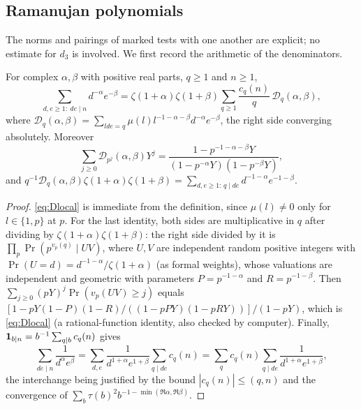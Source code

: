 \documentclass[11pt,colorlinks]{charlie}
\begin{document}
\subsection{Ramanujan polynomials}
The norms and pairings of marked tests with one another are explicit; no estimate for $d_3$ is involved. We first record the arithmetic of the denominators.

\begin{lemma}\label{lem:localfactor}
For complex $\alpha,\beta$ with positive real parts, $q\ge1$ and $n\ge1$,
\begin{equation}\label{eq:ramanujaninv}
 \sum_{d,e\ge1:\ de\mid n}d^{-\alpha}e^{-\beta}=\zeta(1+\alpha)\zeta(1+\beta)\sum_{q\ge1}\frac{c_q(n)}q\,\mathcal D_q(\alpha,\beta),
\end{equation}
where $\mathcal D_q(\alpha,\beta)=\sum_{lde=q}\mu(l)l^{-1-\alpha-\beta}d^{-\alpha}e^{-\beta}$, the right side converging absolutely. Moreover
\begin{equation}\label{eq:Dlocal}
 \sum_{j\ge0}\mathcal D_{p^j}(\alpha,\beta)Y^j=\frac{1-p^{-1-\alpha-\beta}Y}{(1-p^{-\alpha}Y)(1-p^{-\beta}Y)},
\end{equation}
and $q^{-1}\mathcal D_q(\alpha,\beta)\zeta(1+\alpha)\zeta(1+\beta)=\sum_{d,e\ge1:\,q\mid de}d^{-1-\alpha}e^{-1-\beta}$.
\end{lemma}
\begin{proof}
\eqref{eq:Dlocal} is immediate from the definition, since $\mu(l)\ne0$ only for $l\in\{1,p\}$ at $p$. For the last identity, both sides are multiplicative in $q$ after dividing by $\zeta(1+\alpha)\zeta(1+\beta)$: the right side divided by it is $\prod_p\Pr(p^{v_p(q)}\mid UV)$, where $U,V$ are independent random positive integers with $\Pr(U=d)=d^{-1-\alpha}/\zeta(1+\alpha)$ (as formal weights), whose valuations are independent and geometric with parameters $P=p^{-1-\alpha}$ and $R=p^{-1-\beta}$. Then $\sum_{j\ge0}(pY)^j\Pr(v_p(UV)\ge j)$ equals $[1-pY(1-P)(1-R)/((1-pPY)(1-pRY))]/(1-pY)$, which is \eqref{eq:Dlocal} (a rational-function identity, also checked by computer). Finally, $\mathbf{1}_{b\mid n}=b^{-1}\sum_{q\mid b}c_q(n)$ gives
\[
 \sum_{de\mid n}\frac1{d^{\alpha}e^{\beta}}=\sum_{d,e}\frac{1}{d^{1+\alpha}e^{1+\beta}}\sum_{q\mid de}c_q(n)=\sum_qc_q(n)\!\sum_{q\mid de}\frac{1}{d^{1+\alpha}e^{1+\beta}},
\]
the interchange being justified by the bound $|c_q(n)|\le(q,n)$ and the convergence of $\sum_b\tau(b)^2b^{-1-\min(\Re\alpha,\Re\beta)}$.
\end{proof}
\end{document}
